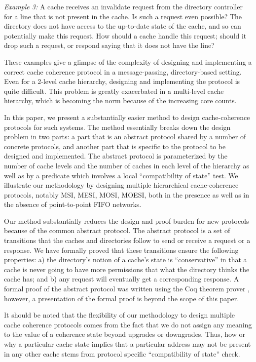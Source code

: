 \noindent \emph{Example 3:} A cache receives an invalidate request from the
directory controller for a line that is not present in the cache. Is such a
request even possible? The directory does not have access to the up-to-date
state of the cache, and so can potentially make this request. How should a
cache handle this request; should it drop such a request, or respond saying
that it does not have the line?

These examples give a glimpse of the complexity of designing and implementing a
correct cache coherence protocol in a message-passing, directory-based setting.
Even for a 2-level cache hierarchy, designing and implementing the protocol is
quite difficult. This problem is greatly exacerbated in a multi-level cache
hierarchy, which is becoming the norm because of the increasing core counts. 

In this paper, we present a substantially easier method to design
cache-coherence protocols for such systems. The method essentially breaks down
the design problem in two parts: a part that is an abstract protocol shared by
a number of concrete protocols, and another part that is specific to the
protocol to be designed and implemented. The abstract protocol is parameterized
by the number of cache levels and the number of caches in each level of the
hierarchy as well as by a predicate which involves a local ``compatibility of
state'' test. We illustrate our methodology by designing multiple
hierarchical cache-coherence protocols, notably MSI, MESI, MOSI, MOESI, both in
the presence as well as in the absence of point-to-point FIFO networks.

Our method substantially reduces the design and proof burden for new protocols
because of the common abstract protocol. The abstract protocol is a set of
transitions that the caches and directories follow to send or receive a request
or a response. We have formally proved that these transitions ensure the
following properties: a) the directory's notion of a cache's state is
``conservative'' in that a cache is never going to have more permissions that
what the directory thinks the cache has; and b) any request will eventually get
a corresponding response. A formal proof of the abstract protocol was written
using the Coq theorem prover \cite{}, however, a presentation of the formal
proof is beyond the scope of this paper.

It should be noted that the flexibility of our methodology to design multiple
cache coherence protocols comes from the fact that we do not assign any meaning
to the value of a coherence state beyond upgrades or downgrades. Thus, how or
why a particular cache state implies that a particular address may not be
present in any other cache stems from protocol specific ``compatibility of
state'' check. 

